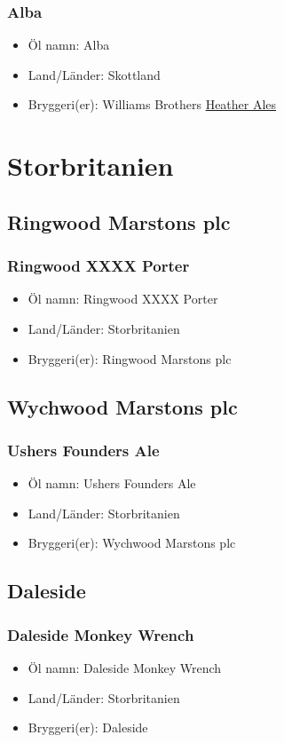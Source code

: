 \documentclass[11pt]{article}
\begin{document}
\subsubsection{Alba}
\label{sec:orgf53a5eb}
\begin{itemize}
\item Öl namn: Alba
\item Land/Länder: Skottland
\item Bryggeri(er): Williams Brothers \uline{Heather Ales}
\end{itemize}
\section{Storbritanien}
\label{sec:orgb00ff4f}
\subsection{Ringwood Marstons plc}
\label{sec:orga01a8fd}
\subsubsection{Ringwood XXXX Porter}
\label{sec:org14d7044}
\begin{itemize}
\item Öl namn: Ringwood XXXX Porter
\item Land/Länder: Storbritanien
\item Bryggeri(er): Ringwood Marstons plc
\end{itemize}
\subsection{Wychwood Marstons plc}
\label{sec:org6eab5c7}
\subsubsection{Ushers Founders Ale}
\label{sec:org1500e75}
\begin{itemize}
\item Öl namn: Ushers Founders Ale
\item Land/Länder: Storbritanien
\item Bryggeri(er): Wychwood Marstons plc
\end{itemize}
\subsection{Daleside}
\label{sec:org33dde50}
\subsubsection{Daleside Monkey Wrench}
\label{sec:org91bbbf5}
\begin{itemize}
\item Öl namn: Daleside Monkey Wrench
\item Land/Länder: Storbritanien
\item Bryggeri(er): Daleside
\end{itemize}
\end{document}
